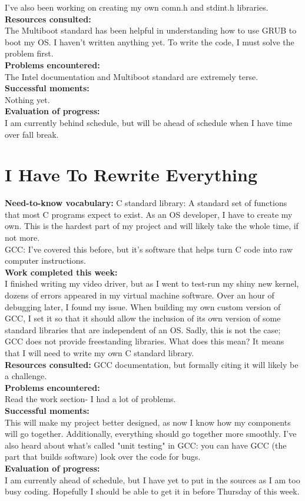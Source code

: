\documentclass[11pt]{article}
\begin{document}
I've also been working on creating my own comn.h and stdint.h libraries.\\
\textbf{Resources consulted:}\\
The Multiboot standard has been helpful in understanding how to use GRUB to boot my OS. I haven't written anything yet. To write the code, I must solve the problem first.\\
\textbf{Problems encountered:}\\
The Intel documentation and Multiboot standard are extremely terse.\\
\textbf{Successful moments:}\\
Nothing yet.\\
\textbf{Evaluation of progress:}\\
I am currently behind schedule, but will be ahead of schedule when I have time over fall break.
\section{I Have To Rewrite Everything}
\textbf{Need-to-know vocabulary:}
C standard library: A standard set of functions that most C programs expect to exist. As an OS developer, I have to create my own. This is the hardest part of my project and will likely take the whole time, if not more.\\
GCC: I've covered this before, but it's software that helps turn C code into raw computer instructions. \\
\textbf{Work completed this week:}\\
I finished writing my video driver, but as I went to test-run my shiny new kernel, dozens of errors appeared in my virtual machine software. Over an hour of debugging later, I found my issue. When building my own custom version of GCC, I set it so that it should allow the inclusion of its own version of some standard libraries that are independent of an OS. Sadly, this is not the case; GCC does not provide freestanding libraries. What does this mean? It means that I will need to write my own C standard library.\\
\textbf{Resources consulted:}
GCC documentation, but formally citing it will likely be a challenge.\\
\textbf{Problems encountered:}\\
Read the work section- I had a lot of problems.\\
\textbf{Successful moments:}\\
This will make my project better designed, as now I know how my components will go together. Additionally, everything should go together more smoothly. I've also heard about what's called "unit testing" in GCC: you can have GCC (the part that builds software) look over the code for bugs.\\
\textbf{Evaluation of progress:}\\
I am currently ahead of schedule, but I have yet to put in the sources as I am too busy coding. Hopefully I should be able to get it in before Thursday of this week.
\end{document}

